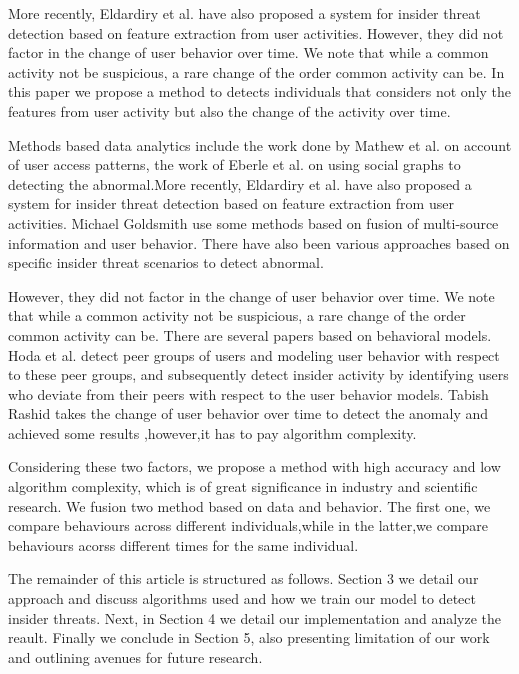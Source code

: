 \documentclass[conference]{IEEEtran}
\begin{document}
More recently, Eldardiry et al. \cite{b29} have also proposed a system for insider threat detection based on feature extraction from user activities. However, they did not factor in the change of user behavior over time. We note that while a common activity not be suspicious, a rare change of the order  common activity can be. In this paper we propose a method to detects individuals that considers not only the features from user activity but also the change of the activity over time.
\fi

Methods based data analytics include the work done by Mathew et al.\cite{b5} on account of user access patterns, the work of Eberle et al. \cite{b6} on using social graphs to detecting the abnormal.More recently, Eldardiry et al. \cite{b29} have also proposed a system for insider threat detection based on feature extraction from user activities. Michael Goldsmith use some methods based on fusion of multi-source information and user behavior\cite{b38}. There have also been various approaches based on specific insider threat scenarios to detect abnormal\cite{b7}\cite{b8}. 

However, they did not factor in the change of user behavior over time. We note that while a common activity not be suspicious, a rare change of the order  common activity can be.
There are several papers based on behavioral models\cite{b10}\cite{b11}\cite{b12}. Hoda et al. \cite{b13}detect peer groups of users and modeling user behavior with respect to these peer groups, and subsequently detect insider activity by identifying users who deviate from their peers with respect to the user behavior models. 
Tabish Rashid \cite{b37} takes the change of user behavior  over time to detect the anomaly and achieved some results ,however,it has to pay algorithm complexity. 

Considering these two factors, we propose a method with high accuracy and low algorithm complexity, which is of great significance in industry and scientific research. We fusion two method based on data and behavior.
The first one, we compare behaviours across different individuals,while in the latter,we compare behaviours acorss different times for the same individual.  

The remainder of this article is structured as follows. Section 3
we detail our approach and discuss algorithms used and how we train our model to detect insider threats. Next, in Section 4
we detail our implementation and analyze the reault. 
Finally we conclude in Section 5, also presenting limitation of our work
and outlining avenues for future research.
\end{document}
